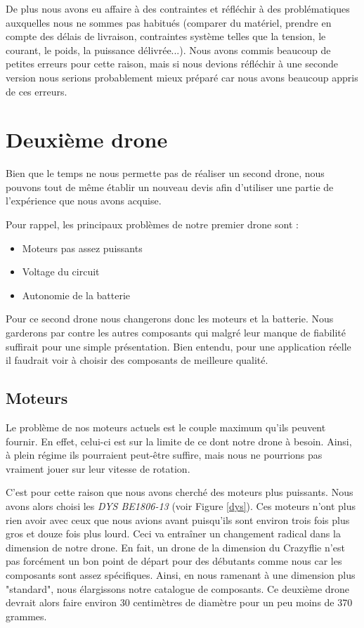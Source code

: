 \documentclass[a4paper,10pt]{report}
\begin{document}
      De plus nous avons eu affaire à des contraintes et réfléchir à des 
problématiques auxquelles nous ne sommes pas habitués (comparer du matériel, 
prendre en compte des délais de livraison, contraintes système telles que la 
tension, le courant, le poids, la puissance délivrée...). Nous avons commis 
beaucoup de petites erreurs pour cette raison, mais si nous devions réfléchir à 
une seconde version nous serions probablement mieux préparé car nous avons 
beaucoup appris de ces erreurs.
  
  \chapter{Deuxième drone}
    Bien que le temps ne nous permette pas de réaliser un second drone, nous 
pouvons tout de même établir un nouveau devis afin d'utiliser une partie de 
l'expérience que nous avons acquise.

    Pour rappel, les principaux problèmes de notre premier drone sont :
    
      \begin{itemize}
	\item Moteurs pas assez puissants
	\item Voltage du circuit
	\item Autonomie de la batterie
      \end{itemize}
      
   Pour ce second drone nous changerons donc les moteurs et la batterie. Nous 
garderons par contre les autres composants qui malgré leur manque de fiabilité 
suffirait pour une simple présentation. Bien entendu, pour une application 
réelle il faudrait voir à choisir des composants de meilleure qualité.

    \section{Moteurs}
      Le problème de nos moteurs actuels est le couple maximum qu'ils peuvent 
fournir. En effet, celui-ci est sur la limite de ce dont notre drone à besoin. 
Ainsi, à plein régime ils pourraient peut-être suffire, mais nous ne pourrions 
pas vraiment jouer sur leur vitesse de rotation. 

      C'est pour cette raison que nous avons cherché des moteurs plus 
puissants. Nous avons alors choisi les \textit{DYS BE1806-13} (voir Figure 
\ref{dys}). Ces moteurs n'ont plus rien avoir avec ceux que nous avions avant 
puisqu'ils sont environ trois fois plus gros et douze fois plus lourd. Ceci va 
entraîner un changement radical dans la dimension de notre drone. En fait, un 
drone de la dimension du Crazyflie n'est pas forcément un bon point de départ 
pour des débutants comme nous car les composants sont assez spécifiques. Ainsi, 
en nous ramenant à une dimension plus "standard", nous élargissons notre 
catalogue de composants. Ce deuxième drone devrait alors faire environ 30 
centimètres de diamètre pour un peu moins de 370 grammes.
\end{document}
